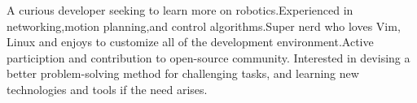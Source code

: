 

\begin{cvparagraph}

 A curious developer seeking to learn more on robotics.Experienced in networking,motion planning,and control algorithms.Super nerd who loves Vim, Linux and enjoys to customize all of the development environment.Active particiption and contribution to open-source community. Interested in devising a better problem-solving method for challenging tasks, and learning new technologies and tools if the need arises.
\end{cvparagraph}
